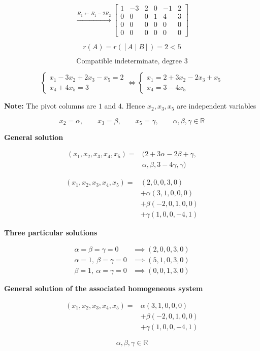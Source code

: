 \begin{answer}
    $$
    \xrightarrow{R_1\leftarrow R_1-2R_2}
    \left[
    \begin{array}{ccccc|c}
    1&-3&2&0&-1&2\\
    0&0&0&1&4&3\\
    0&0&0&0&0&0\\
    0&0&0&0&0&0
    \end{array}
    \right]
    $$

    $$
    r(A)=r([A\mid B])=2<5
    $$

    $$
    \boxed{
    \text{Compatible indeterminate, degree }3
    }
    $$

    $$
    \begin{cases}
        x_1-3x_2+2x_3-x_5=2\\
        x_4+4x_5=3
    \end{cases}
    \iff
    \begin{cases}
        x_1=2+3x_2-2x_3+x_5\\
        x_4=3-4x_5
    \end{cases}
    $$

    {\color{red}
    \textbf{Note:} The pivot columns are
    $1$ and $4$. Hence $x_2,x_3,x_5$
    are independent variables
    }

    $$
    x_2=\alpha,\qquad
    x_3=\beta,\qquad
    x_5=\gamma,
    \qquad
    \alpha,\beta,\gamma\in\mathbb R
    $$

    \textbf{General solution}

    $$
    \begin{aligned}
    (x_1,x_2,x_3,x_4,x_5)
    ={}&(2+3\alpha-2\beta+\gamma,\\
       &\alpha,\beta,3-4\gamma,\gamma)
    \end{aligned}
    $$

    $$
    \begin{aligned}
    (x_1,x_2,x_3,x_4,x_5)
    ={}&(2,0,0,3,0)\\
       &+\alpha(3,1,0,0,0)\\
       &+\beta(-2,0,1,0,0)\\
       &+\gamma(1,0,0,-4,1)
    \end{aligned}
    $$

    \textbf{Three particular solutions}

    $$
    \begin{aligned}
    \alpha=\beta=\gamma=0
    &\implies (2,0,0,3,0)\\
    \alpha=1,\ \beta=\gamma=0
    &\implies (5,1,0,3,0)\\
    \beta=1,\ \alpha=\gamma=0
    &\implies (0,0,1,3,0)
    \end{aligned}
    $$

    \textbf{General solution of the
    associated homogeneous system}

    $$
    \boxed{
    \begin{aligned}
    (x_1,x_2,x_3,x_4,x_5)
    ={}&\alpha(3,1,0,0,0)\\
       &+\beta(-2,0,1,0,0)\\
       &+\gamma(1,0,0,-4,1)
    \end{aligned}
    }
    $$

    $$
    \alpha,\beta,\gamma\in\mathbb R
    $$
\end{answer}
